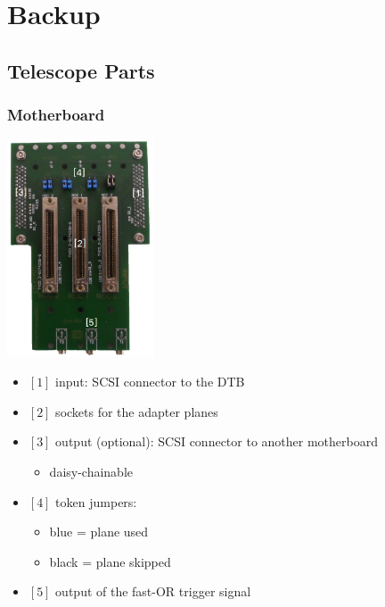 \documentclass[9pt]{beamer}
\begin{document}
\section*{Backup}
\subsection*{Telescope Parts}
\begin{frame}
	\addtocounter{framenumber}{-1}
	\frametitle{Motherboard}
	\begin{center}
		\begin{minipage}{4.6cm}
			\centering
			\includegraphics[width=4.35cm]{Pics/Motherboard}
		\end{minipage}
		\hspace*{2pt}
		\begin{minipage}[c][.7\textheight]{6cm}
			\begin{itemize}
				\setlength{\itemsep}{\fill}
				\item $[1]$ input: SCSI connector to the DTB
				\item $[2]$ sockets for the adapter planes
				\item $[3]$ output (optional): SCSI connector to another motherboard
				\begin{itemize}
					\item daisy-chainable
				\end{itemize}
				\item $[4]$ token jumpers:
				\begin{itemize}
					\item blue\hspace{4pt} = plane used
					\item black = plane skipped
				\end{itemize}
				\item $[5]$ output of the fast-OR trigger signal 
			\end{itemize}
		\end{minipage}\no\s
	\end{center}
\end{frame}
\end{document}
